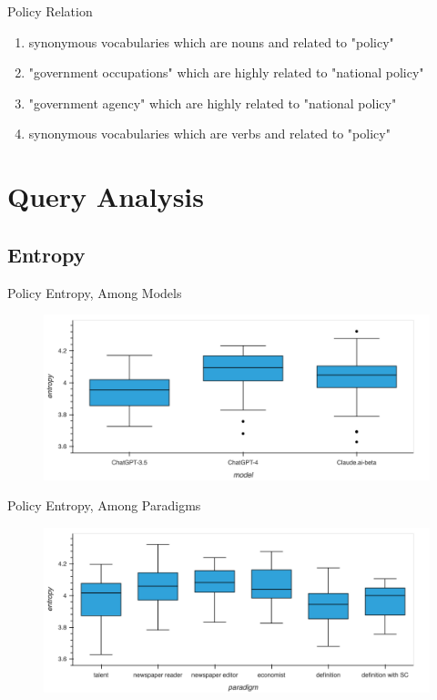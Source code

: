 \documentclass[12pt]{beamer}
\begin{document}
\begin{frame}{Policy Relation}
\begin{enumerate}
    \item synonymous vocabularies which are nouns and related to "policy"
    \item "government occupations" which are highly related to "national policy"
    \item "government agency" which are highly related to "national policy"
    \item synonymous vocabularies which are verbs and related to "policy"
\end{enumerate}
\end{frame}


\section{Query Analysis}


\subsection{Entropy}
\begin{frame}{Policy Entropy, Among Models}
\begin{figure}[H]
\centering
\includegraphics[width=11.5cm]{Figures/fig11.png}
\end{figure}
\end{frame}


\begin{frame}{Policy Entropy, Among Paradigms}
\begin{figure}[H]
\centering
\includegraphics[width=11.5cm]{Figures/fig12.png}
\end{figure}
\end{frame}
\end{document}
